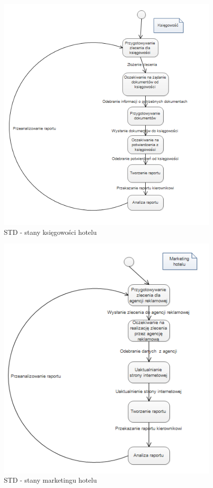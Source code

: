 \documentclass[a4paper, 11pt]{article}
\begin{document}
	\indent
	\begin{figure}[H]%
			\includegraphics[scale=1.0]{Img/STD-kierownik1.png}
			\caption{STD - stany księgowości hotelu}
	\end{figure}
	\begin{figure}[H]%
		\includegraphics[scale=1.0]{Img/STD-kierownik2.png}
		\caption{STD - stany marketingu hotelu}
	\end{figure}
\end{document}
